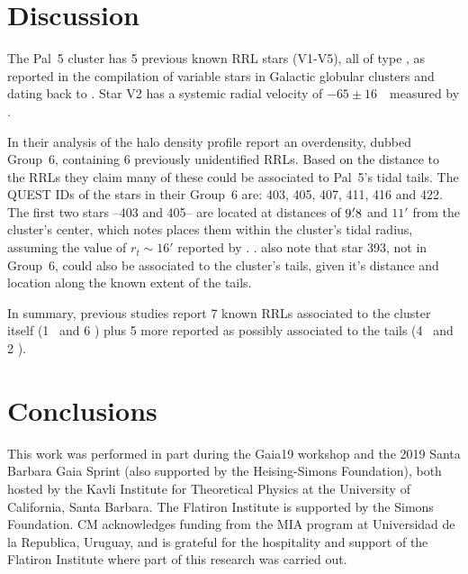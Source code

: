 \documentclass[twocolumn]{aastex63}
\begin{document}
{\section{Discussion}

The Pal~5 cluster has 5 previous known RRL stars (V1-V5), all of type \typec, as reported in the \citet{Clement2001} compilation of variable stars in Galactic globular clusters and dating back to \citet{SawyerHogg1973}. Star V2 has a  systemic radial velocity of  $-65\pm16$~\kms~measured by \citet{Vivas2005}.

In their analysis of the halo density profile \citet{Vivas2006} report an overdensity, dubbed Group~6, containing 6 previously unidentified RRLs. Based on the distance to the RRLs they claim many of these could be associated to Pal~5's tidal tails. The QUEST IDs of the stars in their Group~6 are: 403, 405, 407, 411, 416 and 422. The first two stars --403 and 405-- are located at distances of  $9\mbox{$.\mkern-4mu^\prime$}8$ and $11'$ from the cluster's center, which \citet{Vivas2004} notes places them within the cluster's tidal radius, assuming the value of $r_t\sim16'$ reported by \citet{Odenkirchen:2002}.  . \citet{Vivas2006} also note that star 393, not in Group~6, could also be associated to the cluster's tails, given it's distance and location along the known extent of the tails.

In summary,  previous studies report 7 known RRLs associated to the cluster itself (1 \typeab~and 6 \typec) plus 5 more reported as possibly associated to the tails (4 \typeab~and 2 \typec).



\section{Conclusions} \label{sec:conclusions}


\acknowledgments
This work was performed in part during the Gaia19 workshop and the 2019 Santa Barbara Gaia Sprint (also supported by the Heising-Simons Foundation), both hosted by the Kavli Institute for Theoretical Physics at the University of California, Santa Barbara. The Flatiron Institute is supported by the Simons Foundation. CM acknowledges funding from the MIA program at Universidad de la Republica, Uruguay, and is grateful for the hospitality and support of the Flatiron Institute where part of this research was carried out.

}
\end{document}
